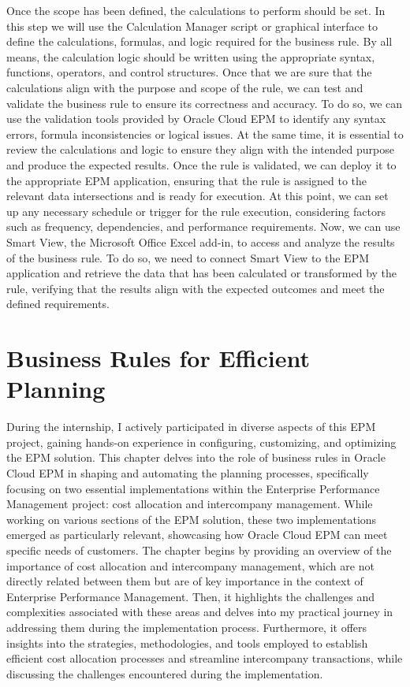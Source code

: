 \documentclass[12pt,a4paper,openright,twoside]{book}
\begin{document}
Once the scope has been defined, the calculations to perform should be set.
%
In this step we will use the Calculation Manager script or graphical interface to define the calculations, formulas, and logic required for the business rule. 
%
By all means, the calculation logic should be written using the appropriate syntax, functions, operators, and control structures.
%
Once that we are sure that the calculations align with the purpose and scope of the rule, we can test and validate the business rule to ensure its correctness and accuracy. 
%
To do so, we can use the validation tools provided by Oracle Cloud EPM to identify any syntax errors, formula inconsistencies or logical issues. 
%
At the same time, it is essential to review the calculations and logic to ensure they align with the intended purpose and produce the expected results.
%
Once the rule is validated, we can deploy it to the appropriate EPM application, ensuring that the rule is assigned to the relevant data intersections and is ready for execution. 
%
At this point, we can set up any necessary schedule or trigger for the rule execution, considering factors such as frequency, dependencies, and performance requirements.
%
Now, we can use Smart View, the Microsoft Office Excel add-in, to access and analyze the results of the business rule.
%
To do so, we need to connect Smart View to the EPM application and retrieve the data that has been calculated or transformed by the rule, verifying that the results align with the expected outcomes and meet the defined requirements.

\chapter{Business Rules for Efficient Planning}
\label{chap:cmyactivity}

During the internship, I actively participated in diverse aspects of this EPM project, gaining hands-on experience in configuring, customizing, and optimizing the EPM solution. 
%
This chapter delves into the role of business rules in Oracle Cloud EPM in shaping and automating the planning processes, specifically focusing on two essential implementations within the Enterprise Performance Management project: cost allocation and intercompany management. 
%
While working on various sections of the EPM solution, these two implementations emerged as particularly relevant, showcasing how Oracle Cloud EPM can meet specific needs of customers.
%
The chapter begins by providing an overview of the importance of cost allocation and intercompany management, which are not directly related between them but are of key importance in the context of Enterprise Performance Management.
%
Then, it highlights the challenges and complexities associated with these areas and delves into my practical journey in addressing them during the implementation process.
%
Furthermore, it offers insights into the strategies, methodologies, and tools employed to establish efficient cost allocation processes and streamline intercompany transactions, while discussing the challenges encountered during the implementation.
\end{document}
